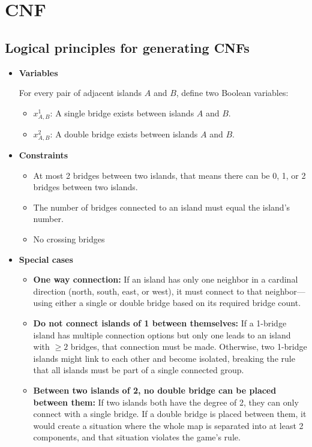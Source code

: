 \section{CNF}
\subsection{Logical principles for generating CNFs}
\begin{itemize}
	\item \textbf{Variables}
	      \begin{flushleft}
		      For every pair of adjacent islands \(A\) and \(B\), define two Boolean variables:
		      \begin{itemize}
			      \item \(x^1_{A,B}\): A single bridge exists between islands \(A\) and \(B\).
			      \item \(x^2_{A,B}\): A double bridge exists between islands \(A\) and \(B\).
		      \end{itemize}
	      \end{flushleft}
	\item \textbf{Constraints}
	      \begin{itemize}
		      \item At most 2 bridges between two islands, that means there can be 0, 1, or 2 bridges between two islands.
		      \item The number of bridges connected to an island must equal the island's number.
		      \item No crossing bridges
	      \end{itemize}
	\item \textbf{Special cases}
	      \begin{itemize}
		      \item \textbf{One way connection:} If an island has only one neighbor in a cardinal direction (north, south, east, or west), it must connect to that neighbor—using either a single or double bridge based on its required bridge count.
		      \item \textbf{Do not connect islands of 1 between themselves:} If a 1-bridge island has multiple connection options but only one leads to an island with \(\ge 2\) bridges, that connection must be made. Otherwise, two 1-bridge islands might link to each other and become isolated, breaking the rule that all islands must be part of a single connected group.
		      \item \textbf{Between two islands of 2, no double bridge can be placed between them:} If two islands both have the degree of 2, they can only connect with a single bridge. If a double bridge is placed between them, it would create a situation where the whole map is separated into at least 2 components, and that situation violates the game's rule.

\end{itemize}
\end{itemize}
